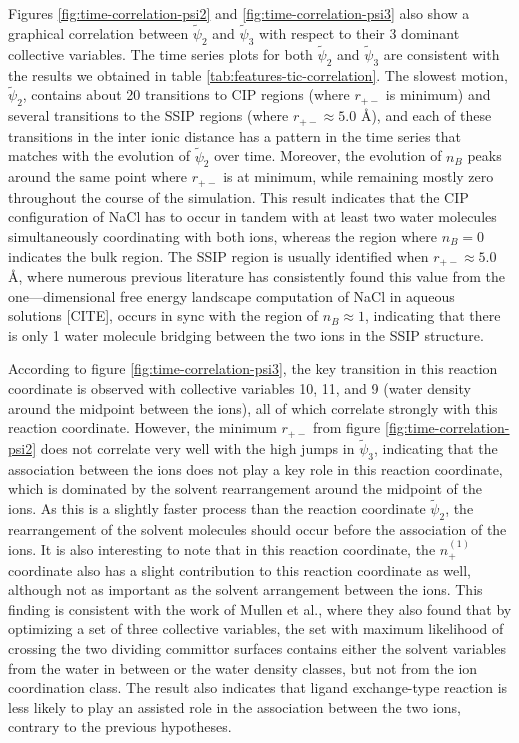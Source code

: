 \begin{spacing}{2.0}
    Figures \ref{fig:time-correlation-psi2} and \ref{fig:time-correlation-psi3} also show a graphical correlation between $\tilde{\psi}_2$ and 
    $\tilde{\psi}_3$ with respect to their 3 dominant collective variables. The time series plots for both $\tilde{\psi}_2$ and $\tilde{\psi}_3$ 
    are consistent with the results we obtained in table \ref{tab:features-tic-correlation}. The slowest motion, $\tilde{\psi}_2$, contains about 
    20 transitions to CIP regions (where $r_{+-}$ is minimum) and several transitions to the SSIP regions (where $r_{+-} \approx 5.0$ \r{A}), and 
    each of these transitions in the inter ionic distance has a pattern in the time series that matches with the evolution of $\tilde{\psi}_2$ over 
    time. Moreover, the evolution of $n_B$ peaks around the same point where $r_{+-}$ is at minimum, while remaining mostly zero throughout the 
    course of the simulation. This result indicates that the CIP configuration of NaCl has to occur in tandem with at least two water molecules 
    simultaneously coordinating with both ions, whereas the region where $n_B = 0$ indicates the bulk region. The SSIP region is usually identified 
    when $r_{+-} \approx 5.0$ \r{A}, where numerous previous literature has consistently found this value from the one—dimensional free energy 
    landscape computation of NaCl in aqueous solutions [CITE], occurs in sync with the region of $n_B \approx 1$, indicating that there is only 1 
    water molecule bridging between the two ions in the SSIP structure.

    According to figure \ref{fig:time-correlation-psi3}, the key transition in this reaction coordinate is observed with collective variables 10, 
    11, and 9 (water density around the midpoint between the ions), all of which correlate strongly with this reaction coordinate. However, the 
    minimum $r_{+-}$ from figure \ref{fig:time-correlation-psi2} does not correlate very well with the high jumps in $\tilde{\psi}_3$, indicating 
    that the association between the ions does not play a key role in this reaction coordinate, which is dominated by the solvent rearrangement 
    around the midpoint of the ions. As this is a slightly faster process than the reaction coordinate $\tilde{\psi}_2$, the rearrangement of the 
    solvent molecules should occur before the association of the ions. It is also interesting to note that in this reaction coordinate, the 
    $n_+^{(1)}$ coordinate also has a slight contribution to this reaction coordinate as well, although not as important as the solvent arrangement 
    between the ions. This finding is consistent with the work of Mullen et al., where they also found that by optimizing a set of three collective 
    variables, the set with maximum likelihood of crossing the two dividing committor surfaces contains either the solvent variables from the water 
    in between or the water density classes, but not from the ion coordination class. The result also indicates that ligand exchange-type reaction 
    is less likely to play an assisted role in the association between the two ions, contrary to the previous hypotheses.

\end{spacing}
